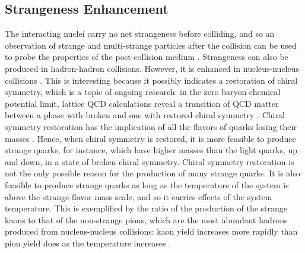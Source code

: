 \subsection{Strangeness Enhancement}
The interacting nuclei carry no net strangeness before colliding, and so an observation of strange and multi-strange particles after the collision can be used to probe the properties of the post-collision medium \cite{1742-6596-455-1-012005}. Strangeness can also be produced in hadron-hadron collisions. However, it is enhanced in nucleus-nucleus collisions \cite{Behera:2012eq}. This is interesting because it possibly indicates a restoration of chiral symmetry, which is a topic of ongoing research: in the zero baryon chemical potential limit, lattice QCD calculations reveal a transition of QCD matter between a phase with broken and one with restored chiral symmetry \cite{ refId0}. Chiral symmetry restoration has the implication of all the flavors of quarks losing their masses \cite{Sazdjian:2016hrz}. Hence, when chiral symmetry is restored, it is more feasible to produce strange quarks, for instance, which have higher masses than the light quarks, up and down, in a state of broken chiral symmetry. Chiral symmetry restoration is not the only possible reason for the production of many strange quarks. It is also feasible to produce strange quarks as long as the temperature of the system is above the strange flavor mass scale, and so it carries effects of the system temperature. This is exemplified by the ratio of the production of the strange kaons to that of the non-strange pions, which are the most abundant hadrons produced from nucleus-nucleus collisions: kaon yield increases more rapidly than pion yield does as the temperature increases \cite{wong1994introduction}.%


